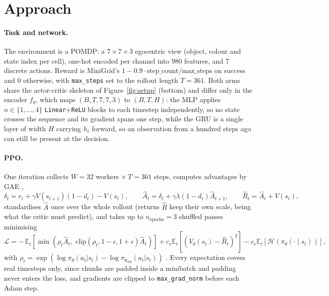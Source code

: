 \documentclass{article}
\begin{document}
\section{Approach}

\paragraph{Task and network.} The environment is a POMDP: a
$7 \times 7 \times 3$ egocentric view (object, colour and state index per cell),
one-hot encoded per channel into $980$ features, and $7$ discrete actions.
Reward is MiniGrid's $1 - 0.9 \cdot \text{step\_count}/\text{max\_steps}$ on
success and $0$ otherwise, with \texttt{max\_steps} set to the rollout length
$T=361$. Both arms share the actor-critic skeleton of Figure~\ref{fig:setup}
(bottom) and differ only in the encoder $f_\theta$, which maps $(B,T,7,7,3)$ to
$(B,T,H)$: the MLP applies $n \in \{1,\dots,4\}$
\texttt{Linear}+\texttt{ReLU} blocks to each timestep independently, so no state
crosses the sequence and its gradient spans one step, while the GRU \citep{gru}
is a single layer of width $H$ carrying $h_t$ forward, so an observation from a
hundred steps ago can still be present at the decision.

\paragraph{PPO.} One iteration collects $W=32$ workers $\times\ T=361$ steps,
computes advantages by GAE \citep{gae},
\begin{equation}
    \delta_t = r_t + \gamma V(s_{t+1})(1 - d_t) - V(s_t), \qquad
    \hat{A}_t = \delta_t + \gamma \lambda (1 - d_t) \hat{A}_{t+1}, \qquad
    \hat{R}_t = \hat{A}_t + V(s_t),
    \label{eq:gae}
\end{equation}
standardises $\hat{A}$ once over the whole rollout (returns $\hat{R}$ keep their
own scale, being what the critic must predict), and takes up to
$n_{\text{epochs}}=3$ shuffled passes minimising
\begin{equation}
    \label{eq:loss}
    \mathcal{L} = -\,\mathbb{E}_t\!\left[\min\!\left(\rho_t \hat{A}_t,\;
    \mathrm{clip}(\rho_t, 1-\epsilon, 1+\epsilon) \hat{A}_t\right)\right]
    + c_v \mathbb{E}_t\!\left[(V_\theta(s_t) - \hat{R}_t)^2\right]
    - c_e \mathbb{E}_t\!\left[\mathcal{H}(\pi_\theta(\cdot \mid s_t))\right],
\end{equation}
with $\rho_t = \exp(\log \pi_\theta(a_t|s_t) - \log \pi_{\theta_{\text{old}}}(a_t|s_t))$
\citep{ppo}. Every expectation covers real timesteps only, since chunks are
padded inside a minibatch and padding never enters the loss, and gradients are
clipped to \texttt{max\_grad\_norm} before each Adam \citep{adam} step.
\end{document}
